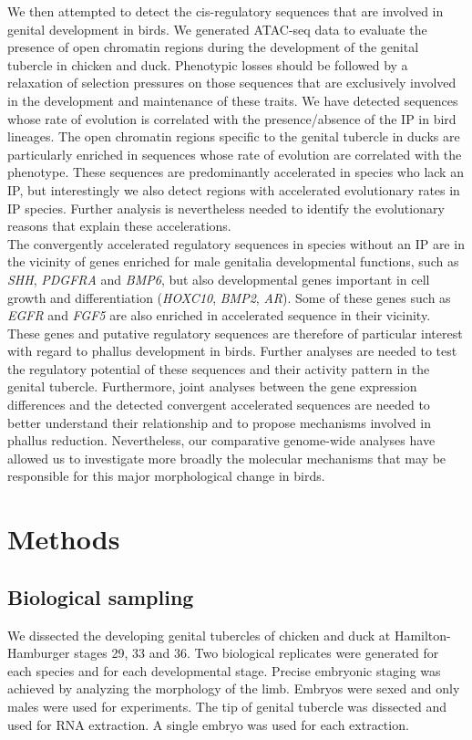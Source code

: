 We then attempted to detect the \gls{cis}-regulatory sequences that are involved in genital development in birds. We generated  ATAC-seq data to evaluate the presence of open chromatin regions during the development of the genital tubercle in chicken and duck. Phenotypic losses should be followed by a relaxation of selection pressures on those sequences that are exclusively involved in the development and maintenance of these traits. We have detected sequences whose rate of evolution is correlated with the presence/absence of the IP in bird lineages. The open chromatin regions specific to the genital tubercle in ducks are particularly enriched in sequences whose rate of evolution are correlated with the phenotype. These sequences are predominantly accelerated in species who lack an IP, but interestingly we also detect regions with accelerated evolutionary rates in IP species. Further analysis is nevertheless needed to identify the evolutionary reasons that explain these accelerations.\\

The convergently accelerated regulatory sequences in species without an IP are in the vicinity of genes enriched for male genitalia developmental functions, such as \textit{SHH}, \textit{PDGFRA} and \textit{BMP6}, but also developmental genes important in cell growth and differentiation (\textit{HOXC10}, \textit{BMP2}, \textit{AR}). Some of these genes such as \textit{EGFR} and \textit{FGF5} are also enriched in accelerated sequence in their vicinity. These genes and putative regulatory sequences are therefore of particular interest with regard to phallus development in birds. Further analyses are needed to test the regulatory potential of these sequences and their activity pattern in the genital tubercle. Furthermore, joint analyses between the gene expression differences and the detected convergent accelerated sequences are needed to better understand their relationship and to propose mechanisms involved in phallus reduction. Nevertheless, our comparative genome-wide analyses have allowed us to investigate more broadly the molecular mechanisms that may be responsible for this major morphological change in birds.

\section{Methods}

\subsection*{Biological sampling}
We dissected the developing genital tubercles of chicken and duck at Hamilton-Hamburger stages 29, 33 and 36. Two biological replicates were generated for each species and for each developmental stage. Precise embryonic staging was achieved by analyzing the morphology of the limb. Embryos were sexed and only males were used for experiments. The tip of genital tubercle was dissected and used for RNA extraction. A single embryo was used for each extraction. 

